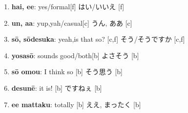 \documentclass[uplatex,dvipdfmx,b5paper,english,10pt]{jsbook}
\begin{document}
\begin{enumerate}%
  \item
    \ifEnglish
    {\bfseries hai, ee}: yes/formal[f] %
    \else
    はい/いいえ [f]
    \fi
  \item
    \ifEnglish
    {\bfseries un, aa}: yup,yah/casual[c] %
    \else
    うん, ああ [c]
   \fi
  \item
    \ifEnglish
    {\bfseries s\=o, s\=odesuka}: yeah,is that so? [c,f]%
    \else
    そう/そうですか [c,f]
    \fi
  \item
    \ifEnglish
    {\bfseries yosas\=o}: sounds good/both[b]%
    \else
    よさそう [b]
    \fi
  \item
    \ifEnglish
    {\bfseries s\=o omou}: I think so [b]%
    \else
    そう思う [b]
    \fi
  \item
    \ifEnglish
    {\bfseries desun\=e}: it is! [b]%
    \else
    ですねぇ [b]
    \fi
  \item
    \ifEnglish
    {\bfseries ee mattaku}: totally [b]%
    \else
    ええ, まったく [b]
    \fi


\end{enumerate}
\end{document}
